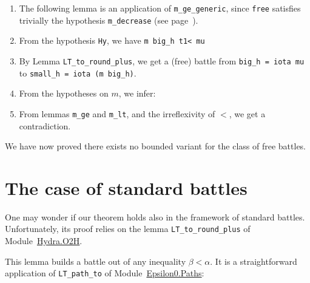 


\begin{enumerate}
\item The following lemma is an application of \texttt{m\_ge\_generic}, since \texttt{free}
satisfies trivially the hypothesis \texttt{m\_decrease} (see page~\pageref{remark:m-decrease}).




\item From the hypothesis \texttt{Hy}, we have \texttt{m big\_h t1< mu}
\item By Lemma \texttt{LT\_to\_round\_plus}, we get a (free) battle from
\texttt{big\_h = iota mu} to \texttt{small\_h = iota (m big\_h)}.




\item From the hypotheses on $m$, we infer:


\item From lemmas \texttt{m\_ge} and \texttt{m\_lt}, and the irreflexivity of $<$, we get a contradiction. 


\end{enumerate}

We have now proved there exists no bounded variant for the class of free battles.




\section{The case of standard battles}
\label{sec:standard-intro}\label{std-case}
One may wonder if our theorem holds also in the framework of standard battles. Unfortunately, its proof relies on the lemma \texttt{LT\_to\_round\_plus} of
Module~\href{../theories/html/hydras.Hydra.O2H.html}{Hydra.O2H}.



This lemma builds a battle out of any inequality $\beta<\alpha$. 
It is a straightforward application of \texttt{LT\_path\_to} of
Module~\href{../theories/html/hydras.Epsilon0.Paths.html}{Epsilon0.Paths}:



